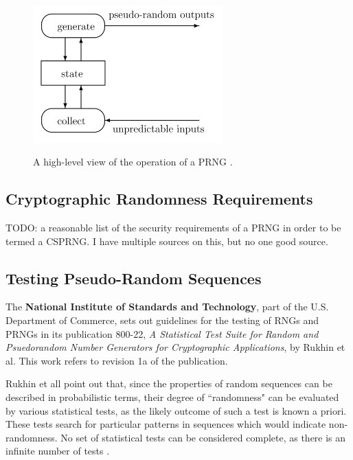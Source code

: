 \documentclass[12pt, titlepage]{report}
\theoremstyle{definition}
\begin{document}
\begin{figure}
\centering
\includegraphics[width=0.65\textwidth]{img/prng_high_level.png}\\
\caption{A high-level view of the operation of a PRNG \cite{kelsey1998cryptanalytic}.}
\label{figure:prng_high_level}
\end{figure}
	


\subsection{Cryptographic Randomness Requirements}\label{subsection:crypto_requirements}
TODO: a reasonable list of the security requirements of a PRNG in order to be termed a CSPRNG. I have multiple sources on this, but no one good source.



\subsection{Testing Pseudo-Random Sequences}\label{subsection:testing_prngs}
The \textbf{National Institute of Standards and Technology}, part of the U.S. Department of Commerce, sets out guidelines for the testing of RNGs and PRNGs in its publication 800-22, \textit{A Statistical Test Suite for Random and Psuedorandom Number Generators for Cryptographic Applications}, by Rukhin et al. This work refers to revision 1a of the publication.

Rukhin et all point out that, since the properties of random sequences can be described in probabilistic terms, their degree of ``randomness" can be evaluated by various statistical tests, as the likely outcome of such a test is known a priori. These tests search for particular patterns in sequences which would indicate non-randomness. No set of statistical tests can be considered complete, as there is an infinite number of tests \cite[p. 1-2]{rukhin2001statistical}.
\end{document}
